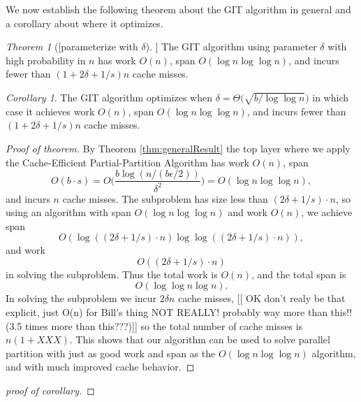 \documentclass[sigconf]{acmart}
\theoremstyle{remark}
\newtheorem{theorem}{Theorem}[section]
\newtheorem{corollary}[thm]{Corollary}
\theoremstyle{remark}
\begin{document}
We now establish the following theorem about the GIT algorithm in general and a corollary about where it optimizes.
\begin{theorem}
	[[parameterize with $\delta$]]
	The GIT algorithm using parameter $\delta$ with high probability in $n$ has work $O(n)$, span $O(\log n \log\log n)$, and incurs fewer than $(1+2\delta + 1/s)n$ cache misses.
\end{theorem}
\begin{corollary}
	The GIT algorithm optimizes when $\delta = \Theta\Big(\sqrt{b/\log\log n}\Big)$ in which case it achieves work $O(n)$, span $O(\log n \log\log n)$, and incurs fewer than $(1+2\delta + 1/s)n$ cache misses.
\end{corollary}
\begin{proof}[Proof of theorem]
	By Theorem \ref{thm:generalResult} the top layer where we apply the Cache-Efficient Partial-Partition Algorithm has work $O(n)$, span $$O(b\cdot s) = O\Big(\frac{b\log(n/(b\epsilon/2))}{\delta^2}\Big)=O(\log n \log\log n),$$ and incurs $n$ cache misses.
	The subproblem has size less than $(2\delta+1/s)\cdot n$, so using an algorithm with span $O(\log n \log\log n)$ and work $O(n)$, we achieve span
	$$O(\log((2\delta+1/s)\cdot n)\log\log((2\delta+1/s)\cdot n)),$$
	and work $$O((2\delta+1/s)\cdot n)$$
	in solving the subproblem.
	Thus the total work is $O(n)$, and the total span is $$O(\log\log n \log n).$$
	In solving the subproblem we incur $2\delta n$ cache misses, [[ OK don't realy be that explicit, just O(n) for Bill's thing NOT REALLY! probably way more than this!! (3.5 times more than this???)]] so the total number of cache misses is $n(1+XXX)$.
	This shows that our algorithm can be used to solve parallel partition with just as good work and span as the $O(\log n \log\log n)$ algorithm, and with much improved cache behavior.
\end{proof}
\begin{proof}[proof of corollary]
\end{proof}
\end{document}
